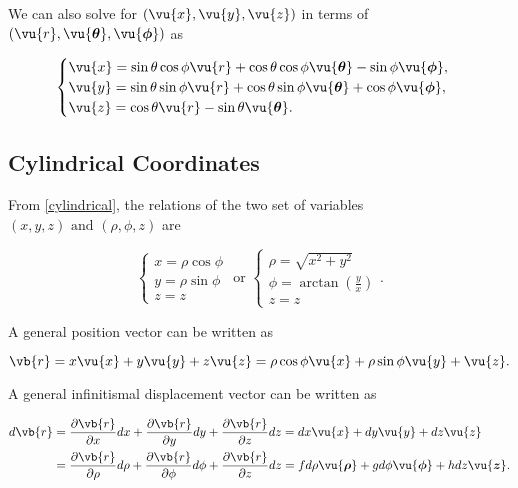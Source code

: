 \documentclass[english,a4paper,12pt]{report}
\begin{document}
We can also solve for \((\vu{x} , \vu{y}, \vu{z} )\) in terms of \((\vu{r} , \vu{\boldsymbol{\theta } }, \vu{\boldsymbol{\phi } } )\) as  

\begin{equation}
    \begin{cases}
        \vu{x} = \sin \theta \cos \phi \vu{r} + \cos \theta \cos \phi \vu{\boldsymbol{\theta } } - \sin \phi \vu{\boldsymbol{\phi } }, \\
        \vu{y} = \sin \theta \sin \phi \vu{r} + \cos \theta \sin \phi \vu{\boldsymbol{\theta } } + \cos \phi \vu{\boldsymbol{\phi } }, \\
        \vu{z} = \cos \theta \vu{r} - \sin \theta \vu{\boldsymbol{\theta } }.
    \end{cases}
\end{equation}



	
\subsection{Cylindrical Coordinates}

From \cref{cylindrical}, the relations of the two set of variables \((x,y,z) \text { and } (\rho , \phi , z)\)  are

\begin{equation}
    \begin{cases} x = \rho \cos \phi \\ y = \rho \sin \phi \\ z = z \end{cases} \text { or } \begin{cases} \rho  = \sqrt{x^2+y^2} \\ \displaystyle \phi = \arctan {\left( \frac{y}{x}  \right)} \\ z = z \end{cases}. 
\end{equation}

A general position vector can be written as 

\begin{equation}
    \vb{r} = x \vu{x} + y \vu{y} + z \vu{z} = \rho \cos \phi  \vu{x} + \rho \sin \phi \vu{y} + \vu{z} .
\end{equation}

A general infinitismal displacement vector can be written as 

\begin{equation}
    \begin{aligned}
    d \vb{r} &= \frac{\partial \vb{r} }{\partial x} dx + \frac{\partial \vb{r} }{\partial y} dy + \frac{\partial \vb{r} }{\partial z} dz = dx \vu{x} + dy \vu{y} + dz \vu{z} \\ &= \frac{\partial \vb{r} }{\partial \rho } d\rho  + \frac{\partial \vb{r} }{\partial \phi  }d \phi  + \frac{\partial \vb{r} }{\partial z}d z =f d \rho  \vu{\boldsymbol{\rho } }  +g d\phi \vu{\boldsymbol{\phi  } } +h  d z\vu{\boldsymbol{z} }. 
    \end{aligned}
\end{equation}
\end{document}
